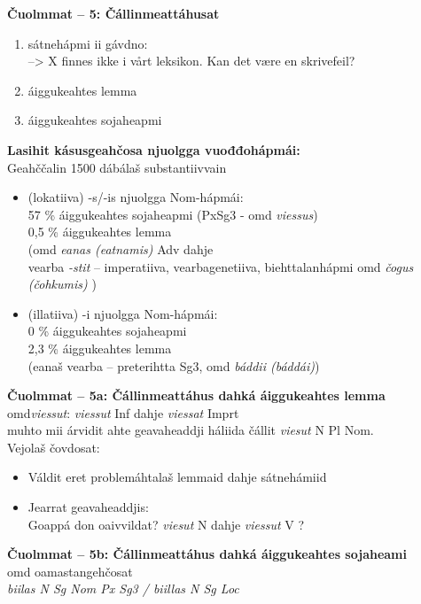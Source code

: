 \documentclass[landscape,norsk,11pt]{seminar}
\begin{document}
\begin{slide}
\newslide
\textbf{Čuolmmat -- 5: Čállinmeattáhusat} \\
\begin{enumerate}
\item sátnehápmi ii gávdno: \\ --> X finnes ikke i vårt leksikon. Kan det være en skrivefeil?
\item áiggukeahtes lemma
\item áiggukeahtes sojaheapmi
\end{enumerate}

\newslide
\textbf{Lasihit kásusgeahčosa njuolgga vuođđohápmái:} \\
Geahččalin 1500 dábálaš substantiivvain 
\begin{itemize}
\item (lokatiiva) -s/-is njuolgga Nom-hápmái: \\
57 \% áiggukeahtes sojaheapmi (PxSg3 - omd \textit{viessus})  \\  0,5 \% áiggukeahtes lemma \\  (omd \textit{eanas (eatnamis)} Adv dahje \\ vearba \textit{-stit} -- imperatiiva, vearbagenetiiva, biehttalanhápmi omd \textit{čogus (čohkumis)} )
\item (illatiiva) -i njuolgga Nom-hápmái: \\
0 \% áiggukeahtes sojaheapmi \\  2,3 \% áiggukeahtes lemma \\ (eanaš vearba -- preterihtta Sg3, omd \textit{báddii (báddái)}) 
\end{itemize}



\newslide
\textbf{Čuolmmat -- 5a: Čállinmeattáhus dahká áiggukeahtes lemma} \\
omd\textit{viessut}: \textit{viessut} Inf dahje \textit{viessat} Imprt \\
muhto mii árvidit ahte geavaheaddji háliida čállit \textit{viesut} N Pl Nom. \\
Vejolaš čovdosat:

\begin{itemize}
\item{Váldit eret problemáhtalaš lemmaid dahje sátnehámiid}
\item{Jearrat geavaheaddjis: \\ Goappá don oaivvildat? \textit{viesut}  N dahje \textit{viessut} V }?
\end{itemize}


\newslide
\textbf{Čuolmmat -- 5b: Čállinmeattáhus dahká áiggukeahtes sojaheami} \\
omd oamastangehčosat \\
\textit{biilas N Sg Nom Px Sg3 / biillas N Sg Loc} \\


\end{slide}
\end{document}
